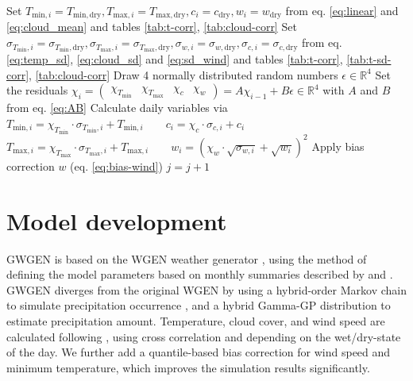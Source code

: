 \begin{refsection}
\begin{algorithm}
\begin{algorithmic}[1]
		\STATE Set $T_{\mathrm{min}, i} = T_{\mathrm{min}, \mathrm{dry}}, T_{\mathrm{max}, i} = T_{\mathrm{max}, \mathrm{dry}}, c_i = c_\mathrm{dry}, w_i = w_\mathrm{dry}$ from eq. \eqref{eq:linear} and \eqref{eq:cloud_mean} and tables \ref{tab:t-corr}, \ref{tab:cloud-corr}
		\label{a:gwgen:adjust_dry}
		\STATE Set $
		\sigma_{T_\mathrm{min},i} = \sigma_{T_\mathrm{min},\mathrm{dry}}, \sigma_{T_\mathrm{max},i} = \sigma_{T_\mathrm{max},\mathrm{dry}}, \sigma_{w,i} = \sigma_{w,\mathrm{dry}}, \sigma_{c,i} = \sigma_{c,\mathrm{dry}}$ from eq. \eqref{eq:temp_sd}, \eqref{eq:cloud_sd} and \eqref{eq:sd_wind} and tables \ref{tab:t-corr}, \ref{tab:t-sd-corr}, \ref{tab:cloud-corr}
		\ENDIF
		\STATE Draw 4 normally distributed random numbers $\epsilon\in\mathbb{R}^4$  \label{a:gwgen:cross}
		\STATE Set the residuals 
		$\chi_i = 
		\begin{pmatrix} 
		\chi_{T_\mathrm{min}} & \chi_{T_\mathrm{max}} & \chi_c & \chi_w
		\end{pmatrix} = A\chi_{i-1} + B\epsilon \in \mathbb{R}^4$ with $A$ and $B$ from eq. \eqref{eq:AB}
		\STATE Calculate daily variables via \\
		$T_{\mathrm{min},i} = \chi_{T_\mathrm{min}} \cdot \sigma_{T_\mathrm{min},i} + T_{\mathrm{min}, i} \qquad c_{i} = \chi_{c} \cdot \sigma_{c,i} + c_{i}$ \\
		$T_{\mathrm{max},i} = \chi_{T_\mathrm{max}} \cdot \sigma_{T_\mathrm{max},i} + T_{\mathrm{max}, i} \qquad w_{i} = \left(\chi_{w} \cdot \sqrt{\sigma_{w,i}} + \sqrt{w_{i}}\right)^2$ \label{a:gwgen:cross-end}
		\STATE Apply bias correction $w$ (eq. \eqref{eq:bias-wind}) 
		\STATE $j = j + 1$
		\ENDFOR
		\ENDWHILE
		\ENDFOR
	\end{algorithmic}
\end{algorithm}


\section{Model development}

GWGEN is based on the WGEN weather generator \citep{Richardson1981}, using the method of defining the model parameters based on monthly summaries described by \cite{GengDevriesSupit1986} and \cite{GengAuburn1987}. GWGEN diverges from the original WGEN by using a hybrid-order Markov chain to simulate precipitation occurrence \citep{Wilks1999}, and a hybrid Gamma-GP distribution \citep{FurrerKatz2008,NeykovNeytchevZucchini2014} to estimate precipitation amount. Temperature, cloud cover, and wind speed are calculated following \citep{Richardson1981}, using cross correlation and depending on the wet/dry-state of the day. We further add a quantile-based bias correction for wind speed and minimum temperature, which improves the simulation results significantly.


\end{refsection}
